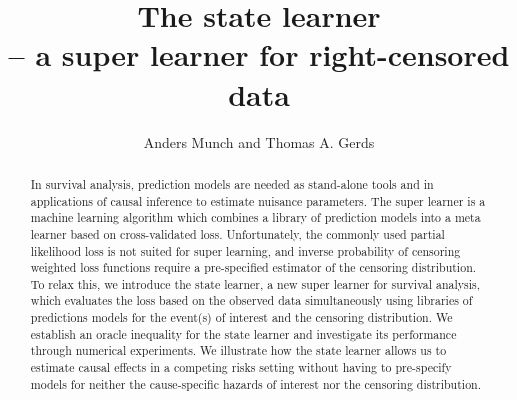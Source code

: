 \documentclass[a4,danish]{article}
\begin{document}

\title{The state learner \\ {-- a super learner for right-censored data}}

\author{Anders Munch and Thomas A. Gerds
}

\maketitle

\begin{abstract}
  In survival analysis, prediction models are needed as stand-alone tools and in
  applications of causal inference to estimate nuisance parameters. The super
  learner is a machine learning algorithm which combines a library of prediction
  models into a meta learner based on cross-validated loss. Unfortunately, the
  commonly used partial likelihood loss is not suited for super learning, and
  inverse probability of censoring weighted loss functions require a
  pre-specified estimator of the censoring distribution. To relax this, we
  introduce the state learner, a new super learner for survival analysis, which
  evaluates the loss based on the observed data simultaneously using libraries
  of predictions models for the event(s) of interest and the censoring
  distribution. We establish an oracle inequality for the state learner and
  investigate its performance through numerical experiments. We illustrate how
  the state learner allows us to estimate causal effects in a competing risks
  setting without having to pre-specify models for neither the cause-specific
  hazards of interest nor the censoring distribution.
\end{abstract}
\end{document}

